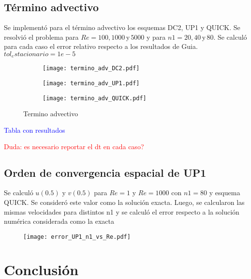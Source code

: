 \documentclass[aps,prb,twocolumn,superscriptaddress,floatfix,longbibliography,10pt]{revtex4-2}
\newcounter{para}
\begin{document}
\subsection{Término advectivo}

Se implementó para el término advectivo los esquemas DC2, UP1 y QUICK. Se resolvió el problema para $Re = 100, 1000 \, \mathrm{y} \, 5000$ y para $n1 = 20, 40 \, \mathrm{y} \, 80$. Se calculó para cada caso el error relativo respecto a los resultados de Guia.
$tol_estacionario = 1e-5$

\begin{figure}
  \centering
  \begin{subfigure}[b]{0.3\textwidth}
      \centering
      \texttt{[image: termino\_adv\_DC2.pdf]}
      \caption{}
      \label{fig:termino_adv_DC2}
  \end{subfigure}
  \hfill
  \begin{subfigure}[b]{0.3\textwidth}
      \centering
      \texttt{[image: termino\_adv\_UP1.pdf]}
      \caption{}
      \label{fig:termino_adv_UP1}
  \end{subfigure}
  \hfill
  \begin{subfigure}[b]{0.3\textwidth}
      \centering
      \texttt{[image: termino\_adv\_QUICK.pdf]}
      \caption{}
      \label{fig:termino_adv_QUICK}
  \end{subfigure}
     \caption{Termino advectivo}
     \label{fig:termino_advectivo}
\end{figure}

\textcolor{blue}{Tabla con resultados}

\textcolor{red}{Duda: es necesario reportar el dt en cada caso?}

\subsection{Orden de convergencia espacial de UP1}

Se calculó $u(0.5)$ y $v(0.5)$ para $Re = 1$ y $Re = 1000$ con $n1 = 80$ y esquema QUICK. Se consideró este valor como la solución exacta. Luego, se calcularon las mismas velocidades para distintos n1 y se calculó el error respecto a la solución numérica considerada como la exacta

\begin{figure}[h]
  \texttt{[image: error\_UP1\_n1\_vs\_Re.pdf]}
  \caption{}
   \label{fig:error_UP1_n1_vs_Re}
\end{figure}


\section{Conclusión}


\end{document}

